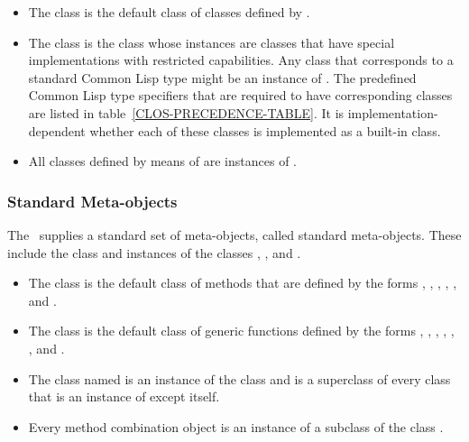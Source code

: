 \begin{itemize}

\item 
The class  is the default class of classes defined
by .

\item  The class  is the class whose
instances are classes that have special implementations with
restricted capabilities.  Any class that corresponds to a standard
Common Lisp type
might be an instance of .
The predefined Common Lisp type specifiers that are required to have
corresponding classes are listed in table~\ref{CLOS-PRECEDENCE-TABLE}.
It is implementation-dependent whether each of these classes is implemented as a built-in class.

\item 
All classes defined by means of  are instances of 
.
\end{itemize}


\subsubsection{Standard Meta-objects}

The \OS\ supplies a standard set of meta-objects, called {\bit standard
meta-objects}. These include the class  and
instances of the classes , 
, and .

\begin{itemize}

\item  
The class  is the default class of
methods that are defined by the forms , 
, , , 
, and .

\item 
The class  is the default class of 
generic functions defined by the forms ,
, , ,
, , and .

\item  The class named  is an instance of
the class  and is a superclass of every class that
is an instance of  except itself.

\item  Every method combination object is an instance of a
subclass of the class .

\end{itemize}


